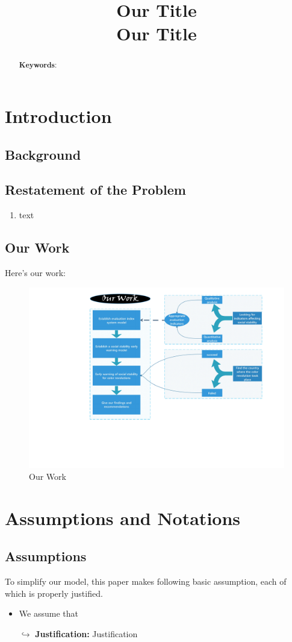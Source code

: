 \documentclass[12pt]{article}  %
\title{\huge{\textbf{{\sc Our Title}}}\\ Our Title}  %
\begin{document}
\begin{abstract}

    \vspace{5pt}
    \textbf{Keywords}:

\end{abstract}

\maketitle 
\tableofcontents
\section{Introduction}
\subsection{Background}

\subsection{Restatement of the Problem}
\begin{enumerate}
\item text
\end{enumerate}
\subsection{Our Work}
{\LARGE\CheckedBox} 

 Here's our work:
\begin{figure}[htbp]
\centering
\includegraphics[width=.4\textwidth]{img/our work.pdf}
\caption{Our Work}
\end{figure}


\section{Assumptions and Notations}
\subsection{Assumptions}
To simplify our model, this paper makes following basic assumption, each of which is properly
justified.
\begin{itemize}
	\item We assume that

	$\hookrightarrow$ \textbf{Justification:} Justification
\end{itemize}
\end{document}
